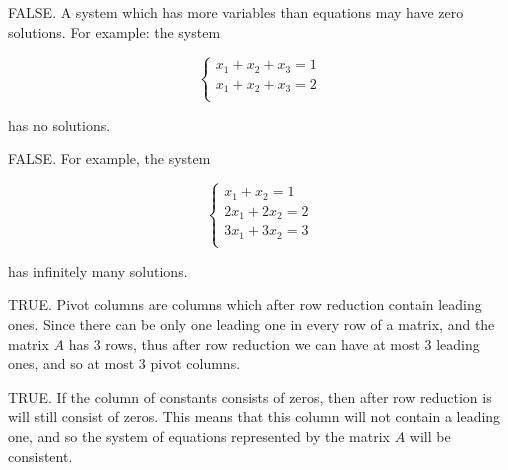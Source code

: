 {\small
\benu

\item[\bf a)] FALSE. A system which has more variables than equations may have zero solutions. 
For example: the system 


$$
\begin{cases}
x_{1} + x_{2} + x_{3} = 1 \\
x_{1} + x_{2} + x_{3} = 2 \\
\end{cases}
$$

has no solutions.


\vskip 5mm


\item[\bf b)] FALSE. For example, the system


$$
\begin{cases}
x_{1} + x_{2} = 1 \\
2x_{1} + 2x_{2} = 2 \\
3x_{1} + 3x_{2} = 3 \\
\end{cases}
$$

has infinitely many solutions.


\vskip 5mm

\item[\bf c)] TRUE. Pivot columns are columns which after row reduction contain leading ones. 
Since there can be only one leading one in every row of a matrix, and  the matrix $A$ has 3 rows, 
thus  after row reduction we can have at most 3 leading ones, and so at most 3 pivot columns. 


\vskip 5mm

\item[\bf d)] TRUE. If the column of constants consists of zeros, then after row reduction is will still 
consist of zeros. This means that this column will not contain a leading one, and so the system 
of equations represented by the matrix $A$ will be consistent. 



\eenu
}



